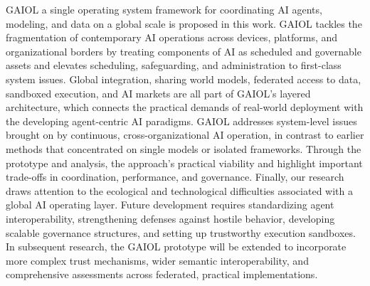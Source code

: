 \documentclass[final,5p,times,twocolumn,authoryear,draft]{elsarticle}
\begin{document}
GAIOL a single operating system framework for coordinating AI agents, modeling, and data on a global scale is proposed in this work. GAIOL tackles the fragmentation of contemporary AI operations across devices, platforms, and organizational borders by treating components of AI as scheduled and governable assets and elevates scheduling, safeguarding, and administration to first-class system issues. Global integration, sharing world models, federated access to data, sandboxed execution, and AI markets are all part of GAIOL's layered architecture, which connects the practical demands of real-world deployment with the developing agent-centric AI paradigms. GAIOL addresses system-level issues brought on by continuous, cross-organizational AI operation, in contrast to earlier methods that concentrated on single models or isolated frameworks. Through the prototype and analysis, the approach's practical viability and highlight important trade-offs in coordination, performance, and governance. Finally, our research draws attention to the ecological and technological difficulties associated with a global AI operating layer. Future development requires standardizing agent interoperability, strengthening defenses against hostile behavior, developing scalable governance structures, and setting up trustworthy execution sandboxes. In subsequent research, the GAIOL prototype will be extended to incorporate more complex trust mechanisms, wider semantic interoperability, and comprehensive assessments across federated, practical implementations.


\end{document}
